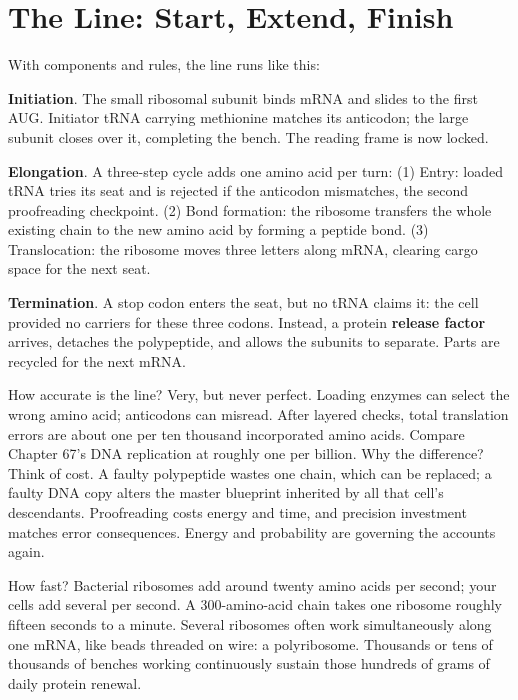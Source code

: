 \section{The Line: Start, Extend, Finish}

With components and rules, the line runs like this:

\textbf{Initiation}. The small ribosomal subunit binds mRNA and slides to the first AUG. Initiator tRNA carrying methionine matches its anticodon; the large subunit closes over it, completing the bench. The reading frame is now locked.

\textbf{Elongation}. A three-step cycle adds one amino acid per turn: (1) Entry: loaded tRNA tries its seat and is rejected if the anticodon mismatches, the second proofreading checkpoint. (2) Bond formation: the ribosome transfers the whole existing chain to the new amino acid by forming a peptide bond. (3) Translocation: the ribosome moves three letters along mRNA, clearing cargo space for the next seat.

\textbf{Termination}. A stop codon enters the seat, but no tRNA claims it: the cell provided no carriers for these three codons. Instead, a protein \textbf{release factor} arrives, detaches the polypeptide, and allows the subunits to separate. Parts are recycled for the next mRNA.

How accurate is the line? Very, but never perfect. Loading enzymes can select the wrong amino acid; anticodons can misread. After layered checks, total translation errors are about one per ten thousand incorporated amino acids. Compare Chapter 67's DNA replication at roughly one per billion. Why the difference? Think of cost. A faulty polypeptide wastes one chain, which can be replaced; a faulty DNA copy alters the master blueprint inherited by all that cell's descendants. Proofreading costs energy and time, and precision investment matches error consequences. Energy and probability are governing the accounts again.

How fast? Bacterial ribosomes add around twenty amino acids per second; your cells add several per second. A 300-amino-acid chain takes one ribosome roughly fifteen seconds to a minute. Several ribosomes often work simultaneously along one mRNA, like beads threaded on wire: a polyribosome. Thousands or tens of thousands of benches working continuously sustain those hundreds of grams of daily protein renewal.

